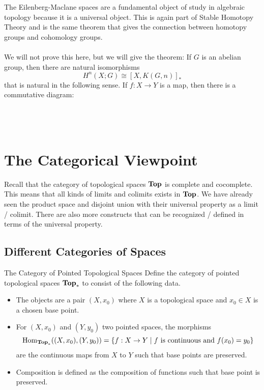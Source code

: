 \documentclass[a4paper]{article}
\begin{document}
The Eilenberg-Maclane spaces are a fundamental object of study in algebraic topology because it is a universal object. This is again part of Stable Homotopy Theory and is the same theorem that gives the connection between homotopy groups and cohomology groups. \\~\\

We will not prove this here, but we will give the theorem: If $G$ is an abelian group, then there are natural isomorphisms $$H^n(X;G)\cong[X,K(G,n)]_\ast$$ that is natural in the following sense. If $f:X\to Y$ is a map, then there is a commutative diagram: \\~\\
\\~\\

\pagebreak
\section{The Categorical Viewpoint}
Recall that the category of topological spaces $\bold{Top}$ is complete and cocomplete. This means that all kinds of limits and colimits exists in $\bold{Top}$. We have already seen the product space and disjoint union with their universal property as a limit / colimit. There are also more constructs that can be recognized / defined in terms of the universal property. 

\subsection{Different Categories of Spaces}
\begin{defn}{The Category of Pointed Topological Spaces}{} Define the category of pointed topological spaces $\bold{Top}_\ast$ to consist of the following data. 
\begin{itemize}
\item The objects are a pair $(X,x_0)$ where $X$ is a topological space and $x_0\in X$ is a chosen base point. 
\item For $(X,x_0)$ and $(Y,y_0)$ two pointed spaces, the morphisms $$\operatorname{Hom}_{\bold{Top}_\ast}((X,x_0),(Y,y_0))=\{f:X\to Y\;|\;f\text{ is continuous and }f(x_0)=y_0\}$$ are the continuous maps from $X$ to $Y$ such that base points are preserved. 
\item Composition is defined as the composition of functions such that base point is preserved. 
\end{itemize}
\end{defn}
\end{document}
